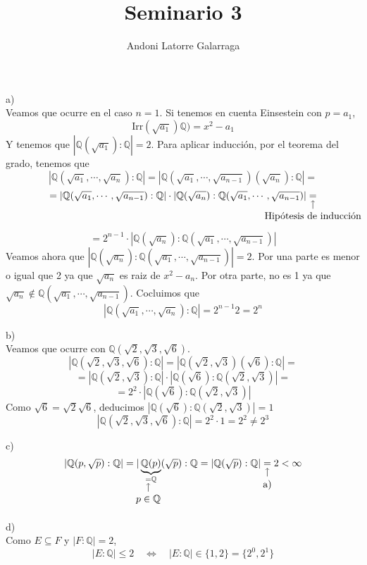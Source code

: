 \documentclass{article}
\title{Seminario 3}
\author{Andoni Latorre Galarraga}
\date{}
\newcommand{\bb}[1]{\mathbb{#1}}
\newcommand{\nota}[3][2ex]{
    \underset{\mathclap{
        \begin{tikzpicture}
          \draw[->] (0, 0) to ++(0,#1);
          \node[below] at (0,0) {#3};
        \end{tikzpicture}}}{#2}
}
\begin{document}
\maketitle

a)\\
Veamos que ocurre en el caso $n=1$. Si tenemos en cuenta Einsestein con $p=a_1$,
$$
\text{Irr}(\sqrt{a_1})\bb{Q}) = x^2-a_1
$$
Y tenemos que $|\bb{Q}(\sqrt{a_1}):\bb{Q}| = 2$. Para aplicar inducción, por el teorema del grado, tenemos que
$$
|\bb{Q}(\sqrt{a_1},\cdots,\sqrt{a_n}):\bb{Q}|
=
|\bb{Q}(\sqrt{a_1},\cdots,\sqrt{a_{n-1}})(\sqrt{a_n}):\bb{Q}|
=
$$
$$
=
|\bb{Q}(\sqrt{a_1},\cdots,\sqrt{a_{n-1}}):\bb{Q}|
\cdot
|\bb{Q}(\sqrt{a_n}):\bb{Q}(\sqrt{a_1},\cdots,\sqrt{a_{n-1}})|
\nota{=}{Hipótesis de inducción}
$$
$$
=
2^{n-1}
\cdot
|\bb{Q}(\sqrt{a_n}):\bb{Q}(\sqrt{a_1},\cdots,\sqrt{a_{n-1}})|
$$
Veamos ahora que $|\bb{Q}(\sqrt{a_n}):\bb{Q}(\sqrt{a_1},\cdots,\sqrt{a_{n-1}})|=2$. Por una parte es menor o igual que 2 ya que $\sqrt{a_n}$ es raiz de $x^2-a_n$. Por otra parte, no es 1 ya que $\sqrt{a_n}\notin \bb{Q}(\sqrt{a_1},\cdots,\sqrt{a_{n-1}})$. Cocluimos que
$$
|\bb{Q}(\sqrt{a_1},\cdots,\sqrt{a_n}):\bb{Q}| = 2^{n-1} 2 = 2^n
$$

b)\\
Veamos que ocurre con $\bb{Q}(\sqrt{2},\sqrt{3},\sqrt{6})$.
$$
|\bb{Q}(\sqrt{2},\sqrt{3},\sqrt{6}):\bb{Q}|=|\bb{Q}(\sqrt{2},\sqrt{3})(\sqrt{6}):\bb{Q}| =
$$
$$
= |\bb{Q}(\sqrt{2},\sqrt{3}):\bb{Q}| \cdot |\bb{Q}(\sqrt{6}):\bb{Q}(\sqrt{2},\sqrt{3})| =
$$
$$
= 2^2 \cdot |\bb{Q}(\sqrt{6}):\bb{Q}(\sqrt{2},\sqrt{3})|
$$
Como $\sqrt{6}=\sqrt{2}\sqrt{6}$, deducimos $|\bb{Q}(\sqrt{6}):\bb{Q}(\sqrt{2},\sqrt{3})|=1$
$$
|\bb{Q}(\sqrt{2},\sqrt{3},\sqrt{6}):\bb{Q}|=2^2\cdot 1= 2^2 \ne 2^3
$$

c)\\
$$
|\bb{Q}(p,\sqrt{p}):\bb{Q}|
= |\underbrace{\bb{Q}(p)}_{\nota{=}{$p\in\bb{Q}$} \bb{Q}}(\sqrt{p}):\bb{Q}
= |\bb{Q}(\sqrt{p}):\bb{Q}|
\nota{=}{a)} 2 < \infty
$$

d)\\
Como $E\subseteq F$ y $|F:\bb{Q}| = 2$,
$$
|E:\bb{Q}|\le 2 \quad \Leftrightarrow \quad |E:\bb{Q}|\in \{1,2\} = \{2^0, 2^1\}
$$
\end{document}
